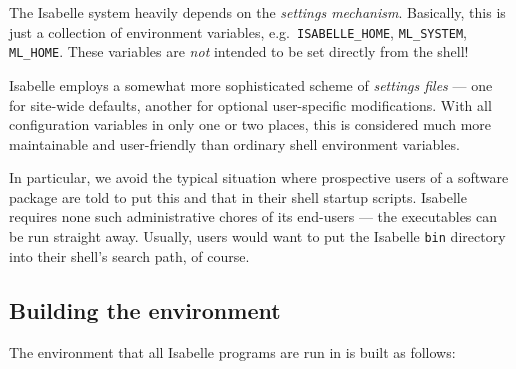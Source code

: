 The Isabelle system heavily depends on the \emph{settings
  mechanism}. Basically, this is just a collection
of environment variables, e.g.\ \texttt{ISABELLE_HOME},
\texttt{ML_SYSTEM}, \texttt{ML_HOME}.  These variables are \emph{not}
intended to be set directly from the shell!

Isabelle employs a somewhat more sophisticated scheme of
\emph{settings files} --- one for site-wide defaults, another for
optional user-specific modifications.  With all configuration
variables in only one or two places, this is considered much more
maintainable and user-friendly than ordinary shell environment
variables.

In particular, we avoid the typical situation where prospective users
of a software package are told to put this and that in their shell
startup scripts. Isabelle requires none such administrative chores of
its end-users --- the executables can be run straight away. Usually,
users would want to put the Isabelle \texttt{bin} directory into their
shell's search path, of course.


\subsection{Building the environment}

The environment that all Isabelle programs are run in is built as
follows:

